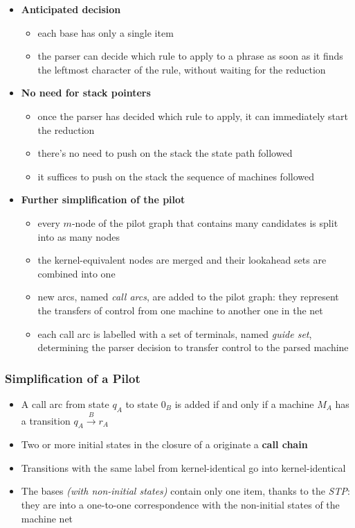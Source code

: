 \documentclass[english]{article}
\begin{document}
\begin{itemize}
  \item \textbf{Anticipated decision}
        \begin{itemize}[label=\(\rightarrow\)]
          \item each \mstate base has only a single item
          \item the parser can decide which rule to apply to a phrase as soon as it finds the leftmost character of the rule, without waiting for the reduction
        \end{itemize}
  \item \textbf{No need for stack pointers}
        \begin{itemize}[label=\(\rightarrow\)]
          \item once the parser has decided which rule to apply, it can immediately start the reduction
          \item there's no need to push on the stack the state path followed
          \item it suffices to push on the stack the sequence of machines followed
        \end{itemize}
  \item \textbf{Further simplification of the pilot}
        \begin{itemize}[label=\(\rightarrow\)]
          \item every \(m\)-node of the pilot graph that contains many candidates is split into as many nodes
          \item the kernel-equivalent nodes are merged and their lookahead sets are combined into one
          \item new arcs, named \textit{call arcs}, are added to the pilot graph: they represent the transfers of control from one machine to another one in the net
          \item each call arc is labelled with a set of terminals, named \textit{guide set}, determining the parser decision to transfer control to the parsed machine
        \end{itemize}
\end{itemize}

\subsubsection[Simplification of a ELL(1) Pilot]{Simplification of a \ello Pilot}

\begin{itemize}
  \item A call arc from state \(q_A\) to state \(0_B\) is added if and only if a machine \(M_A\) has a transition \(q_A \xrightarrow{B} r_A\)
  \item Two or more initial states in the closure of a \mstate originate a \textbf{call chain}
  \item Transitions with the same label from kernel-identical \mstates go into kernel-identical \mstates
  \item The \mstate bases \textit{(with non-initial states)} contain only one item, thanks to the \textit{STP}: they are into a one-to-one correspondence with the non-initial states of the machine net
\end{itemize}
\end{document}
